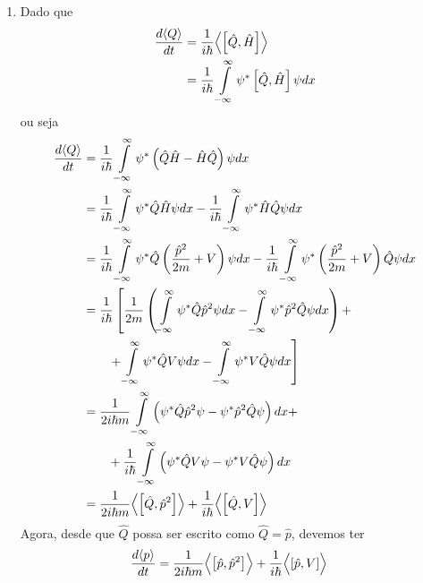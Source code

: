 \begin{prob}
\begin{sol}
\begin{enumerate}[label=\alph *)]
			\item Dado que
				\begin{align}
					\frac{d \langle Q \rangle}{dt} &= \frac{1}{i \hbar} \Bigl \langle \left[\hat{Q},\hat{H}\right] \Bigr \rangle\nonumber\\
																				 &= \frac{1}{i \hbar} \int\limits_{-\infty}^{\infty} \psi^{*}\left[\hat{Q},\hat{H}\right] \psi dx
				\end{align}
				ou seja
				\begin{align}
					\frac{d \langle Q \rangle}{dt} &= \frac{1}{i \hbar} \int\limits_{-\infty}^{\infty} \psi^{*}\left(\hat{Q}\hat{H}-\hat{H}\hat{Q}\right) \psi dx\nonumber\\
																				 &= \frac{1}{i \hbar} \int\limits_{-\infty}^{\infty} \psi^{*}\hat{Q}\hat{H} \psi dx-\frac{1}{i \hbar}\int\limits_{-\infty}^{\infty} \psi^{*}\hat{H}\hat{Q} \psi dx\nonumber\\
																				 &= \frac{1}{i \hbar} \int\limits_{-\infty}^{\infty} \psi^{*}\hat{Q}\left(\frac{\hat{p}^{2}}{2m}+V\right) \psi dx-\frac{1}{i \hbar}\int\limits_{-\infty}^{\infty} \psi^{*}\left(\frac{\hat{p}^{2}}{2m}+V\right)\hat{Q} \psi dx\nonumber\\
																				 &= \frac{1}{i \hbar}\left[\frac{1}{2m}\left(\int\limits_{-\infty}^{\infty} \psi^{*}\hat{Q}\hat{p}^{2} \psi dx-\int\limits_{-\infty}^{\infty} \psi^{*}\hat{p}^{2}\hat{Q} \psi dx\right)+\right.\nonumber\\&\left.\qquad +\int\limits_{-\infty}^{\infty} \psi^{*}\hat{Q}V \psi dx-\int\limits_{-\infty}^{\infty} \psi^{*}V \hat{Q} \psi dx\right]\nonumber\\
																				 &= \frac{1}{2i \hbar m}\int\limits_{-\infty}^{\infty}\left(\psi^{*}\hat{Q}\hat{p}^{2} \psi-\psi^{*}\hat{p}^{2}\hat{Q} \psi\right)dx+\nonumber\\&\qquad +\frac{1}{i \hbar}\int\limits_{-\infty}^{\infty}\left(\psi^{*}\hat{Q}V \psi-\psi^{*}V \hat{Q} \psi\right)dx\nonumber\\
																				 &= \frac{1}{2i \hbar m}\Bigl \langle \left[\hat{Q},\hat{p}^{2}\right] \Bigr \rangle+\frac{1}{i \hbar}\Bigl \langle \left[\hat{Q},V\right] \Bigr \rangle
				\end{align}
				Agora, desde que $\hat{Q}$ possa ser escrito como $\hat{Q}=\hat{p}$, devemos ter
				\begin{align}
					\frac{d \langle p \rangle}{dt}&= \frac{1}{2i \hbar m}\Bigl \langle \left[\hat{p},\hat{p}^{2}\right] \Bigr \rangle+\frac{1}{i \hbar}\Bigl \langle \left[\hat{p},V\right] \Bigr \rangle

\end{align}
\end{enumerate}
\end{sol}
\end{prob}
